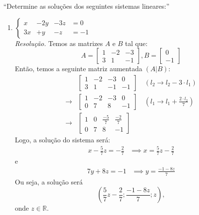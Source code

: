 \enquote{Determine as soluções dos seguintes sistemas lineares:}
\begin{enumerate}
    \item $ \left\{\begin{array} {cccc} 
        x & -2y & - 3z & = 0 \\
        3x & + y & - z & = -1
    \end{array} \right. $
    \\
    \emph{Resolução.} Temos as matrizes $A$ e $B$ tal que:
    \begin{displaymath} 
    A = \left[\begin{array} {ccc} 
        1 & -2 & -3 \\
        3 & 1 & -1
        \end{array} \right], 
    B = \left[\begin{array} {c} 
            0 \\ 
            -1 
        \end{array} \right]
    \end{displaymath}
    Então, temos a seguinte matriz aumentada $(A|B)$:
    \begin{align*}
        &\left[\begin{array} {cccc} 
        1 & -2 & -3 & 0 \\
        3 & 1 & -1 & -1
        \end{array} \right] \quad (l_2 \rightarrow l_2 - 3\cdot l_1) \\ \rightarrow
        &\left[\begin{array} {cccc} 
        1 & -2 & -3 & 0 \\
        0 & 7 & 8 & -1
        \end{array} \right] \quad (l_1 \rightarrow l_1 + \frac{2 \cdot l_2}{7}) \\ \rightarrow 
        &\left[\begin{array} {cccc} 
        1 & 0 & \frac{-5}{7} & \frac{-2}{7} \\
        0 & 7 & 8 & -1
        \end{array} \right]
    \end{align*}
    Logo, a solução do sistema será:
    \begin{align*}
        x - \frac{5}{7}z = -\frac{2}{7} & \implies x = \frac{5}{7}z -\frac{2}{7}
    \end{align*}
    e
    \begin{align*}
        7y + 8z = -1 & \implies y = \frac{-1-8z}{7}
    \end{align*}
    Ou seja, a solução será 
    \begin{displaymath}
        (\frac{5}{7}z -\frac{2}{7}; \frac{-1-8z}{7}; z),
    \end{displaymath}
    onde $z \in \mathbb{R}$.


\end{enumerate}
